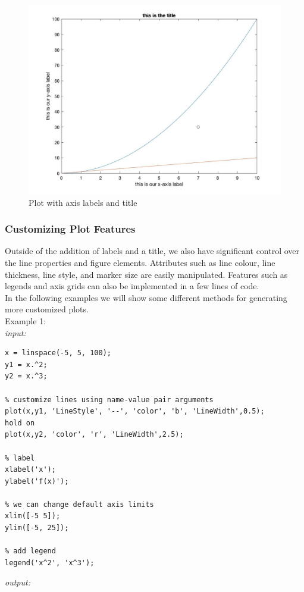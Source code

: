 \documentclass[../MATLAB_Primer.tex]{subfiles}
\begin{document}
\begin{figure}[H]
    \centering
    \includegraphics[width=350pt]{images/plotting_example2.jpg}
    \caption{Plot with axis labels and title}
    \label{fig:plotting_example2}
\end{figure}

\subsubsection{Customizing Plot Features}
Outside of the addition of labels and a title, we also have significant control over the line properties and figure elements.  Attributes such as line colour, line thickness, line style, and marker size are easily manipulated. Features such as legends and axis grids can also be implemented in a few lines of code. \\

In the following examples we will show some different methods for generating more customized plots.\\

Example 1:\\

\textit{input:}
\begin{lstlisting}
x = linspace(-5, 5, 100);
y1 = x.^2;
y2 = x.^3;

% customize lines using name-value pair arguments  
plot(x,y1, 'LineStyle', '--', 'color', 'b', 'LineWidth',0.5);
hold on 
plot(x,y2, 'color', 'r', 'LineWidth',2.5);

% label
xlabel('x');
ylabel('f(x)');

% we can change default axis limits 
xlim([-5 5]);
ylim([-5, 25]);

% add legend 
legend('x^2', 'x^3');
\end{lstlisting}
\textit{output:}
\end{document}
